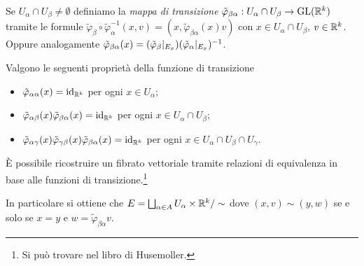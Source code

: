 \begin{definition} 
	Se $U_\alpha\cap U_\beta\ne \emptyset$ definiamo la \emph{mappa di transizione} $\tilde\varphi_{\beta\alpha}:U_\alpha \cap U_\beta \to \mathrm{GL}(\mathbb R^k)$ tramite le formule $\tilde\varphi_\beta \circ \tilde\varphi_\alpha^{-1} (x,v) = (x, \tilde\varphi_{\beta\alpha}(x)v)$ con $x\in U_\alpha \cap U_\beta$, $v\in\mathbb R^k$. Oppure analogamente $\tilde\varphi_{\beta\alpha}(x) = (\tilde\varphi_\beta|_{E_x})(\tilde\varphi_\alpha|_{E_x})^{-1}$.
\end{definition}
	
\begin{proposition}
	Valgono le seguenti proprietà della funzione di transizione
	\begin{itemize}
	 \item $\tilde\varphi_{\alpha\alpha}(x)=\mathrm{id}_{\mathbb R^k}$ per ogni $x\in U_\alpha$;
	 \item $\tilde\varphi_{\alpha\beta}(x)\tilde\varphi_{\beta\alpha}(x) = \mathrm{id}_{\mathbb R^k}$ per ogni $x\in U_\alpha\cap U_\beta$;
	 \item $\tilde\varphi_{\alpha\gamma}(x) \tilde\varphi_{\gamma\beta}(x) \tilde\varphi_{\beta\alpha}(x) = \mathrm{id}_{\mathbb R^k}$ per ogni $x\in U_\alpha\cap U_\beta \cap U_\gamma$.
	\end{itemize}
\end{proposition}

\begin{remark}
	È possibile ricostruire un fibrato vettoriale tramite relazioni di equivalenza in base alle funzioni di transizione.\footnote{Si può trovare nel libro di Husemoller.} %
	
	In particolare si ottiene che $E = \bigsqcup_{\alpha\in A} U_\alpha \times \mathbb R^k / \sim$ dove $(x,v)\sim (y,w)$ se e solo se $x=y$ e $w = \tilde\varphi_{\beta\alpha}v$.
\end{remark}

